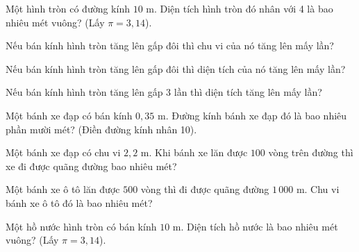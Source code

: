 \begin{ex}
  Một hình tròn có đường kính $10\text{ m}$. Diện tích hình tròn đó nhân với 4 là bao nhiêu mét vuông? (Lấy $\pi = 3{,}14$).
\end{ex}

\begin{ex}
  Nếu bán kính hình tròn tăng lên gấp đôi thì chu vi của nó tăng lên mấy lần?
\end{ex}

\begin{ex}
  Nếu bán kính hình tròn tăng lên gấp đôi thì diện tích của nó tăng lên mấy lần?
\end{ex}

\begin{ex}
  Nếu bán kính hình tròn tăng lên gấp 3 lần thì diện tích tăng lên mấy lần?
\end{ex}

\begin{ex}
  Một bánh xe đạp có bán kính $0{,}35\text{ m}$. Đường kính bánh xe đạp đó là bao nhiêu phần mười mét? (Điền đường kính nhân 10).
\end{ex}

\begin{ex}
  Một bánh xe đạp có chu vi $2{,}2\text{ m}$. Khi bánh xe lăn được $100$ vòng trên đường thì xe đi được quãng đường bao nhiêu mét?
\end{ex}

\begin{ex}
  Một bánh xe ô tô lăn được $500$ vòng thì đi được quãng đường $1\,000\text{ m}$. Chu vi bánh xe ô tô đó là bao nhiêu mét?
\end{ex}

\begin{ex}
  Một hồ nước hình tròn có bán kính $10\text{ m}$. Diện tích hồ nước là bao nhiêu mét vuông? (Lấy $\pi = 3{,}14$).
\end{ex}

